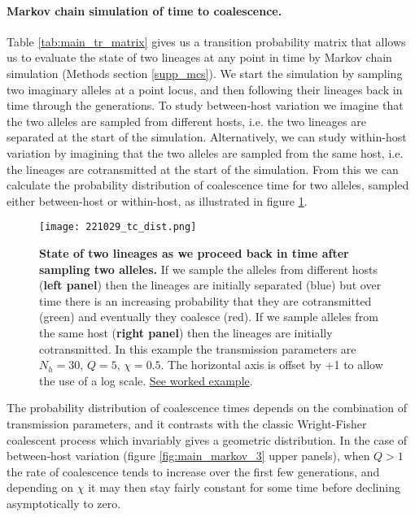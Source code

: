 \documentclass[_main.tex]{subfiles}
\begin{document}
\paragraph{Markov chain simulation of time to coalescence.}  \label{main_mcs}

Table \ref{tab:main_tr_matrix} gives us a transition probability matrix that allows us to evaluate the state of two lineages at any point in time by Markov chain simulation (Methods section \ref{supp_mcs}).  We start the simulation by sampling two imaginary alleles at a point locus, and then following their lineages back in time through the generations.  To study between-host variation we imagine that the two alleles are sampled from different hosts, i.e. the two lineages are separated at the start of the simulation. Alternatively, we can study within-host variation by imagining that the two alleles are sampled from the same host, i.e. the lineages are cotransmitted at the start of the simulation.  From this we can calculate the probability distribution of coalescence time for two alleles, sampled either between-host or within-host, as illustrated in figure \ref{fig:main_markov_4}.   

\begin{figure}[h!]
\centering
\texttt{[image: 221029\_tc\_dist.png]}
\caption{\textbf{State of two lineages as we proceed back in time after sampling two alleles.}  If we sample the alleles from different hosts (\textbf{left panel}) then the lineages are initially separated (blue) but over time there is an increasing probability that they are cotransmitted (green) and eventually they coalesce (red).  If we sample alleles from the same host (\textbf{right panel}) then the lineages are initially cotransmitted. In this example the transmission parameters are $N_h=30$, $Q=5$, $\chi=0.5$.  The horizontal axis is offset by +1 to allow the use of a log scale. \href{https://d-kwiat.github.io/gtg/coalescence-time-basic.html}{See worked example}.
}
\label{fig:main_markov_4}
\end{figure}

The probability distribution of coalescence times depends on the combination of transmission parameters, and it contrasts with the classic Wright-Fisher coalescent process which invariably gives a geometric distribution.  In the case of between-host variation (figure \ref{fig:main_markov_3} upper panels), when $Q>1$ the rate of coalescence tends to increase over the first few generations, and depending on $\chi$ it may then stay fairly constant for some time before declining asymptotically to zero.
\end{document}
